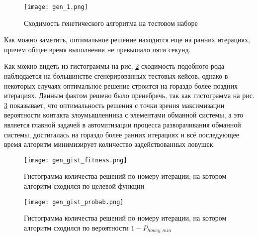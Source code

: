 \begin{figure}[ht]
\centering
	\texttt{[image: gen\_1.png]}  
	\caption{Сходимость генетического алгоритма на тестовом наборе}
	\label{fig:gen_1}
\end{figure}

Как можно заметить, оптимальное решение находится еще на ранних итерациях, причем общее время выполнения не превышало пяти секунд.

Как можно видеть из гистограммы на рис. \ref{fig:gen_gist_fitness} сходимость подобного рода наблюдается на большинстве сгенерированных тестовых кейсов, однако в некоторых случаях оптимальное решение строится на гораздо более поздних итерациях. Данным фактом решено было пренебречь, так как гистограмма на рис. \ref{fig:gen_gist_probab} показывает, что оптимальность решения с точки зрения максимизации вероятности контакта злоумышленника с элементами обманной системы, а это является главной задачей в автоматизации процесса разворачивания обманной системы, достигалась на гораздо более ранних итерациях и всё последующее время алгоритм минимизирует количество задействованных ловушек.

\begin{figure}[ht]
\centering
	\texttt{[image: gen\_gist\_fitness.png]}  
	\caption{Гистограмма количества решений по номеру итерации, на котором алгоритм сходился по целевой функции}
	\label{fig:gen_gist_fitness}
\end{figure}

\begin{figure}[ht]
\centering
	\texttt{[image: gen\_gist\_probab.png]}  
	\caption{Гистограмма количества решений по номеру итерации, на котором алгоритм сходился по вероятности $1 - P_{honey, min}$}
	\label{fig:gen_gist_probab}
\end{figure}